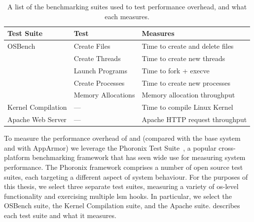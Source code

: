 \begin{table}[htp]
  \centering
  \footnotesize
  \caption[List of benchmarking suites and what they measure]{
    A list of the benchmarking suites used to test performance overhead, and what each
    measures.
  }%
  \label{tab:suites}
  \begin{tabular}{lll}
  \toprule
  Test Suite & Test & Measures \\
  \midrule
  OSBench                    & Create Files       & Time to create and delete files \\
                             & Create Threads     & Time to create new threads \\
                             & Launch Programs    & Time to fork + execve \\
                             & Create Processes   & Time to create new processes \\
                             & Memory Allocations & Memory allocation throughput \\
  Kernel Compilation         & ---                & Time to compile Linux Kernel \\
  Apache Web Server          & ---                & Apache HTTP request throughput \\
  \bottomrule
  \end{tabular}
\end{table}

To measure the performance overhead of \bpfbox{} and \bpfcontain{} (compared with the base
system and with AppArmor) we leverage the Phoronix Test Suite~\cite{phoronix}, a popular
cross-platform benchmarking framework that has seen wide use for measuring system
performance. The Phoronix framework comprises a number of open source test suites, each
targeting a different aspect of system behaviour. For the purposes of this thesis, we
select three separate test suites, measuring a variety of \gls{os}-level functionality and
exercising multiple \gls{lsm} hooks. In particular, we select the OSBench suite, the
Kernel Compilation suite, and the Apache suite.  describes each test
suite and what it measures.

